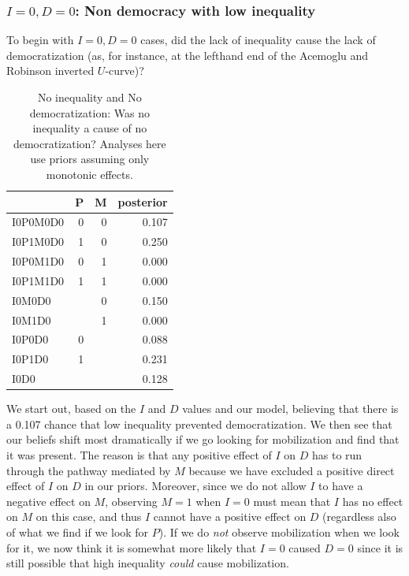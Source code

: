 \documentclass[
  12pt,
]{book}
\begin{document}
\hypertarget{i0-d0-non-democracy-with-low-inequality}{%
\subsubsection{\texorpdfstring{\(I=0, D=0\): Non democracy with low inequality}{I=0, D=0: Non democracy with low inequality}}\label{i0-d0-non-democracy-with-low-inequality}}

To begin with \(I=0, D=0\) cases, did the lack of inequality cause the lack of democratization (as, for instance, at the lefthand end of the Acemoglu and Robinson inverted \(U\)-curve)?

\begin{table}

\caption{\label{tab:Tapp1}No inequality and No democratization: Was no inequality a cause of no democratization? Analyses here use priors assuming only monotonic effects.}
\centering
\begin{tabular}[t]{l|r|r|r}
\hline
  & P & M & posterior\\
\hline
I0P0M0D0 & 0 & 0 & 0.107\\
\hline
I0P1M0D0 & 1 & 0 & 0.250\\
\hline
I0P0M1D0 & 0 & 1 & 0.000\\
\hline
I0P1M1D0 & 1 & 1 & 0.000\\
\hline
I0M0D0 &  & 0 & 0.150\\
\hline
I0M1D0 &  & 1 & 0.000\\
\hline
I0P0D0 & 0 &  & 0.088\\
\hline
I0P1D0 & 1 &  & 0.231\\
\hline
I0D0 &  &  & 0.128\\
\hline
\end{tabular}
\end{table}

We start out, based on the \(I\) and \(D\) values and our model, believing that there is a 0.107 chance that low inequality prevented democratization. We then see that our beliefs shift most dramatically if we go looking for mobilization and find that it was present. The reason is that any positive effect of \(I\) on \(D\) has to run through the pathway mediated by \(M\) because we have excluded a positive direct effect of \(I\) on \(D\) in our priors. Moreover, since we do not allow \(I\) to have a negative effect on \(M\), observing \(M=1\) when \(I=0\) must mean that \(I\) has no effect on \(M\) on this case, and thus \(I\) cannot have a positive effect on \(D\) (regardless also of what we find if we look for \(P\)). If we do \emph{not} observe mobilization when we look for it, we now think it is somewhat more likely that \(I=0\) caused \(D=0\) since it is still possible that high inequality \emph{could} cause mobilization.
\end{document}
